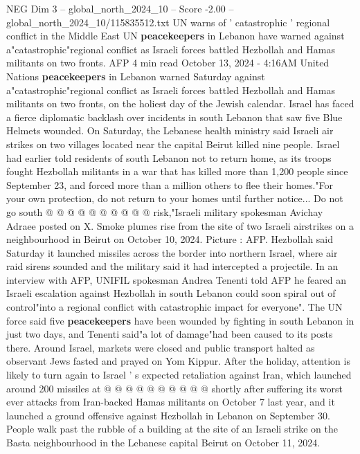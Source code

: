 \begin{textsample}{NEG Dim 3 – global\_north\_2024\_10 – Score -2.00 – global\_north\_2024\_10/115835512.txt}  \label{ex:f3_neg_330}
UN warns of ' catastrophic ' regional conflict in the Middle East UN \textbf{peacekeepers} in Lebanon have warned against a"catastrophic"regional conflict as Israeli forces battled Hezbollah and Hamas militants on two fronts.
AFP 4 min read October 13, 2024 - 4:16AM United Nations \textbf{peacekeepers} in Lebanon warned Saturday against a"catastrophic"regional conflict as Israeli forces battled Hezbollah and Hamas militants on two fronts, on the holiest day of the Jewish calendar.
Israel has faced a fierce diplomatic backlash over incidents in south Lebanon that saw five Blue Helmets wounded.
On Saturday, the Lebanese health ministry said Israeli air strikes on two villages located near the capital Beirut killed nine people.
Israel had earlier told residents of south Lebanon not to return home, as its troops fought Hezbollah militants in a war that has killed more than 1,200 people since September 23, and forced more than a million others to flee their homes."For your own protection, do not return to your homes until further notice...
Do not go south @ @ @ @ @ @ @ @ @ @ risk,"Israeli military spokesman Avichay Adraee posted on X.
Smoke plumes rise from the site of two Israeli airstrikes on a neighbourhood in Beirut on October 10, 2024.
Picture : AFP.
Hezbollah said Saturday it launched missiles across the border into northern Israel, where air raid sirens sounded and the military said it had intercepted a projectile.
In an interview with AFP, UNIFIL spokesman Andrea Tenenti told AFP he feared an Israeli escalation against Hezbollah in south Lebanon could soon spiral out of control"into a regional conflict with catastrophic impact for everyone".
The UN force said five \textbf{peacekeepers} have been wounded by fighting in south Lebanon in just two days, and Tenenti said"a lot of damage"had been caused to its posts there.
Around Israel, markets were closed and public transport halted as observant Jews fasted and prayed on Yom Kippur.
After the holiday, attention is likely to turn again to Israel ' s expected retaliation against Iran, which launched around 200 missiles at @ @ @ @ @ @ @ @ @ @ shortly after suffering its worst ever attacks from Iran-backed Hamas militants on October 7 last year, and it launched a ground offensive against Hezbollah in Lebanon on September 30.
People walk past the rubble of a building at the site of an Israeli strike on the Basta neighbourhood in the Lebanese capital Beirut on October 11, 2024.

\end{textsample}
